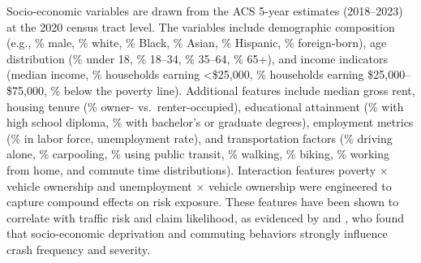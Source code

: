 \documentclass[
  number,
  review,
  3p]{elsarticle}
\begin{document}
Socio-economic variables are drawn from the ACS 5-year estimates
(2018--2023) at the 2020 census tract level. The variables include
demographic composition (e.g., \% male, \% white, \% Black, \% Asian, \%
Hispanic, \% foreign-born), age distribution (\% under 18, \% 18--34, \%
35--64, \% 65+), and income indicators (median income, \% households
earning \textless\$25,000, \% households earning \$25,000--\$75,000, \%
below the poverty line). Additional features include median gross rent,
housing tenure (\% owner- vs.~renter-occupied), educational attainment
(\% with high school diploma, \% with bachelor's or graduate degrees),
employment metrics (\% in labor force, unemployment rate), and
transportation factors (\% driving alone, \% carpooling, \% using public
transit, \% walking, \% biking, \% working from home, and commute time
distributions). Interaction features poverty × vehicle ownership and
unemployment × vehicle ownership were engineered to capture compound
effects on risk exposure. These features have been shown to correlate
with traffic risk and claim likelihood, as evidenced by
\citet{brubacher} and \citet{cabrera}, who found that socio-economic
deprivation and commuting behaviors strongly influence crash frequency
and severity.
\end{document}
